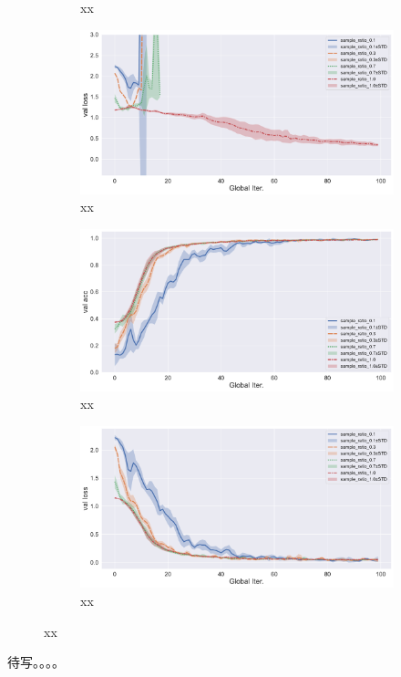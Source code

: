\begin{figure}[ht]
\begin{subfigure}{.5\textwidth}
  \caption{xx}
  \label{fig:fedsplit-compare-sample-ratio-val-acc}
\end{subfigure}%
\begin{subfigure}{.5\textwidth}
  \centering
  \includegraphics[width=.95\linewidth]{figures/fedsplit-compare-sample-ratio-val-loss.pdf}
  \caption{xx}
  \label{fig:fedsplit-compare-sample-ratio-val-loss}
\end{subfigure}
\begin{subfigure}{.5\textwidth}
  \centering
  \includegraphics[width=.95\linewidth]{figures/ifca-compare-sample-ratio-val-acc.pdf}
  \caption{xx}
  \label{fig:ifca-compare-sample-ratio-val-acc}
\end{subfigure}%
\begin{subfigure}{.5\textwidth}
  \centering
  \includegraphics[width=.95\linewidth]{figures/ifca-compare-sample-ratio-val-loss.pdf}
  \caption{xx}
  \label{fig:ifca-compare-sample-ratio-val-loss}
\end{subfigure}
\caption{xx}
\label{fig:fedprox-compare-sample-ratio}
\end{figure}



待写。。。。
